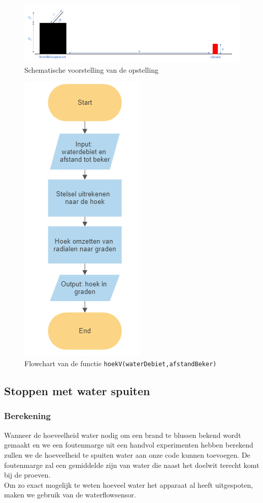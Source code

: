 \documentclass[kulak]{kulakarticle} %
\begin{document}
\begin{figure} [h!]
	\centering
	\includegraphics[width = 1 \textwidth]{schematische voorstelling water LATEX}
	\caption{Schematische voorstelling van de opstelling}
	\label{schematische voorstelling}
\end{figure}

\begin{figure} [h!]
	\centering
	\includegraphics[width = .2 \textwidth]{flowchart_hoekV}
\cprotect\caption{Flowchart van de functie \verb*|hoekV(waterDebiet,afstandBeker)|}
	\label{flowchart_water}
\end{figure}




\subsection{Stoppen met water spuiten}
\subsubsection{Berekening}
Wanneer de hoeveelheid water nodig om een brand te blussen bekend wordt gemaakt en we een foutenmarge uit een handvol experimenten hebben berekend zullen we de hoeveelheid te spuiten water aan onze code kunnen toevoegen. De foutenmarge zal een gemiddelde zijn van water die naast het doelwit terecht komt bij de proeven. \\
Om zo exact mogelijk te weten hoeveel water het apparaat al heeft uitgespoten, maken we gebruik van de waterflowsensor.
\end{document}
